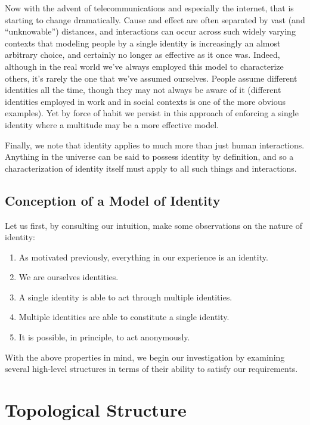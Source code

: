 \documentclass[pra,twocolumn,groupedaddress,10pt]{revtex4}
\theoremstyle{definition}
\begin{document}
Now with the advent of telecommunications and especially the internet, that is starting to change dramatically. Cause and effect are often separated by vast (and ``unknowable'') distances, and interactions can occur across such widely varying contexts that modeling people by a single identity is increasingly an almost arbitrary choice, and certainly no longer as effective as it once was. Indeed, although in the real world we've always employed this model to characterize others, it's rarely the one that we've assumed ourselves. People assume different identities all the time, though they may not always be aware of it (different identities employed in work and in social contexts is one of the more obvious examples). Yet by force of habit we persist in this approach of enforcing a single identity where a multitude may be a more effective model.

Finally, we note that identity applies to much more than just human interactions. Anything in the universe can be said to possess identity by definition, and so a characterization of identity itself must apply to all such things and interactions.

\subsection{Conception of a Model of Identity} \label{sec:conmodide}

Let us first, by consulting our intuition, make some observations on the nature of identity:

\begin{enumerate}
	\item As motivated previously, everything in our experience is an identity.
	\item We are ourselves identities.
	\item A single identity is able to act through multiple identities.
	\item Multiple identities are able to constitute a single identity.
	\item It is possible, in principle, to act anonymously.
\end{enumerate}

With the above properties in mind, we begin our investigation by examining several high-level structures in terms of their ability to satisfy our requirements.

\section{Topological Structure} \label{sec:topstr}
\end{document}
